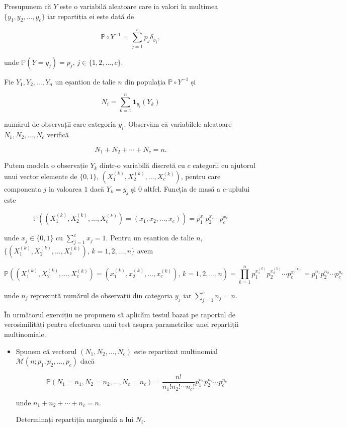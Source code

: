 \documentclass[]{article}
\newenvironment{frshaded*}{%
  \def\FrameCommand{\fboxrule=\FrameRule\fboxsep=\FrameSep \fcolorbox{framecolor}{shadecolor1}}%
  \MakeFramed {\advance\hsize-\width \FrameRestore}}%
{\endMakeFramed}
\newenvironment{rmdblock}[1]
  {\begin{frshaded*}
  \begin{itemize}
  \renewcommand{\labelitemi}{
    \raisebox{-.7\height}[0pt][0pt]{
      {\setkeys{Gin}{width=2em,keepaspectratio}\texttt{[image: images/icons/\#1]}}
    }
  }
  \item
  }
  {
  \end{itemize}
  \end{frshaded*}
  }
\newenvironment{rmdexercise}
  {\begin{rmdblock}{exercise}}
  {\end{rmdblock}}
\begin{document}
Presupunem că \(Y\) este o variabilă aleatoare care ia valori în
mulțimea \(\{y_1,y_2,\ldots,y_c\}\) iar repartiția ei este dată de

\[
\mathbb{P}\circ Y^{-1} = \sum_{j = 1}^{c}p_j\delta_{y_j},
\]

unde \(\mathbb{P}(Y = y_j) = p_{j},\, j\in\{1,2,\ldots,c\}\).

Fie \(Y_1, Y_2,\ldots, Y_n\) un eșantion de talie \(n\) din populația
\(\mathbb{P}\circ Y^{-1}\) și

\[
  N_i = \sum_{k = 1}^{n}\mathbf{1}_{y_i}(Y_k)
\]

numărul de observații care categoria \(y_i\). Observăm că variabilele
aleatoare \(N_1, N_2, \ldots, N_c\) verifică

\[
  N_1 + N_2 +\cdots+ N_c = n.
\]

Putem modela o observație \(Y_k\) dintr-o variabilă discretă cu \(c\)
categorii cu ajutorul unui vector elemente de \(\{0,1\}\),
\((X_1^{(k)}, X_2^{(k)}, \ldots, X_c^{(k)})\), pentru care componenta
\(j\) ia valoarea \(1\) dacă \(Y_k = y_j\) și \(0\) altfel. Funcția de
masă a \(c\)-uplului este

\[
\mathbb{P}((X_1^{(k)}, X_2^{(k)}, \ldots, X_c^{(k)}) = (x_1,x_2,\ldots,x_c)) = p_1^{x_1}p_2^{x_2}\cdots p_c^{x_c}
\]

unde \(x_j\in\{0,1\}\) cu \(\sum_{j = 1}^{c}x_j = 1\). Pentru un
eșantion de talie \(n\),
\(\{(X_1^{(k)}, X_2^{(k)}, \ldots, X_c^{(k)}),\, k = 1,2,\ldots, n\}\)
avem

\[
\mathbb{P}\left((X_1^{(k)}, X_2^{(k)}, \ldots, X_c^{(k)}) = (x_1^{(k)},x_2^{(k)},\ldots,x_c^{(k)}), \,k = 1,2,\ldots,n\right) = \prod_{k=1}^{n}p_1^{x_1^{(k)}}p_2^{x_2^{(k)}}\cdots p_c^{x_c^{(k)}} = p_1^{n_1}p_2^{n_2}\cdots p_c^{n_c}
\]

unde \(n_j\) reprezintă numărul de observații din categoria \(y_j\) iar
\(\sum_{j = 1}^{c}n_j = n\).

În următorul exercițiu ne propunem să aplicăm testul bazat pe raportul
de verosimilități pentru efectuarea unui test asupra parametrilor unei
repartiții multinomiale.

\begin{rmdexercise}
Spunem că vectorul \((N_1, N_2,\ldots, N_c)\) este repartizat
multinomial \(\mathcal{M}(n;p_1,p_2,\ldots,p_c)\) dacă

\[
  \mathbb{P}(N_1 = n_1, N_2 = n_2, \ldots, N_c = n_c) = \frac{n!}{n_1!n_2!\cdots n_c!}p_1^{n_1}p_2^{n_2}\cdots p_c^{n_c}
\]

unde \(n_1 + n_2 +\cdots+n_c = n\).

Determinați repartiția marginală a lui \(N_i\).
\end{rmdexercise}
\end{document}
